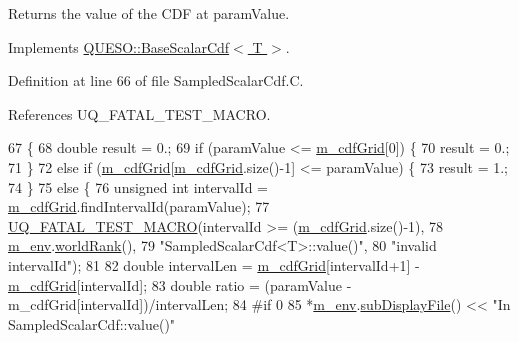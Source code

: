 Returns the value of the C\-D\-F at {\ttfamily param\-Value}. 



Implements \hyperlink{class_q_u_e_s_o_1_1_base_scalar_cdf_a887af6d62eb04f2bf3b58c12e586f20b}{Q\-U\-E\-S\-O\-::\-Base\-Scalar\-Cdf$<$ T $>$}.



Definition at line 66 of file Sampled\-Scalar\-Cdf.\-C.



References U\-Q\-\_\-\-F\-A\-T\-A\-L\-\_\-\-T\-E\-S\-T\-\_\-\-M\-A\-C\-R\-O.


\begin{DoxyCode}
67 \{
68   \textcolor{keywordtype}{double} result = 0.;
69   \textcolor{keywordflow}{if} (paramValue <= \hyperlink{class_q_u_e_s_o_1_1_sampled_scalar_cdf_a58d6744bac9ce8d906839bf381517f4a}{m\_cdfGrid}[0]) \{
70     result = 0.;
71   \}
72   \textcolor{keywordflow}{else} \textcolor{keywordflow}{if} (\hyperlink{class_q_u_e_s_o_1_1_sampled_scalar_cdf_a58d6744bac9ce8d906839bf381517f4a}{m\_cdfGrid}[\hyperlink{class_q_u_e_s_o_1_1_sampled_scalar_cdf_a58d6744bac9ce8d906839bf381517f4a}{m\_cdfGrid}.size()-1] <= paramValue) \{
73     result = 1.;
74   \}
75   \textcolor{keywordflow}{else} \{
76     \textcolor{keywordtype}{unsigned} \textcolor{keywordtype}{int} intervalId = \hyperlink{class_q_u_e_s_o_1_1_sampled_scalar_cdf_a58d6744bac9ce8d906839bf381517f4a}{m\_cdfGrid}.findIntervalId(paramValue);
77     \hyperlink{_defines_8h_a56d63d18d0a6d45757de47fcc06f574d}{UQ\_FATAL\_TEST\_MACRO}(intervalId >= (\hyperlink{class_q_u_e_s_o_1_1_sampled_scalar_cdf_a58d6744bac9ce8d906839bf381517f4a}{m\_cdfGrid}.size()-1),
78                         \hyperlink{class_q_u_e_s_o_1_1_base_scalar_cdf_a3caa986ae1ccef96a28b0365fb88c86c}{m\_env}.\hyperlink{class_q_u_e_s_o_1_1_base_environment_a78b57112bbd0e6dd0e8afec00b40ffa7}{worldRank}(),
79                         \textcolor{stringliteral}{"SampledScalarCdf<T>::value()"},
80                         \textcolor{stringliteral}{"invalid intervalId"});
81 
82     \textcolor{keywordtype}{double} intervalLen = \hyperlink{class_q_u_e_s_o_1_1_sampled_scalar_cdf_a58d6744bac9ce8d906839bf381517f4a}{m\_cdfGrid}[intervalId+1] - \hyperlink{class_q_u_e_s_o_1_1_sampled_scalar_cdf_a58d6744bac9ce8d906839bf381517f4a}{m\_cdfGrid}[intervalId];
83     \textcolor{keywordtype}{double} ratio = (paramValue - m\_cdfGrid[intervalId])/intervalLen;
84 \textcolor{preprocessor}{#if 0}
85 \textcolor{preprocessor}{}    *\hyperlink{class_q_u_e_s_o_1_1_base_scalar_cdf_a3caa986ae1ccef96a28b0365fb88c86c}{m\_env}.\hyperlink{class_q_u_e_s_o_1_1_base_environment_a8a0064746ae8dddfece4229b9ad374d6}{subDisplayFile}() << \textcolor{stringliteral}{"In SampledScalarCdf::value()"}

\end{DoxyCode}
